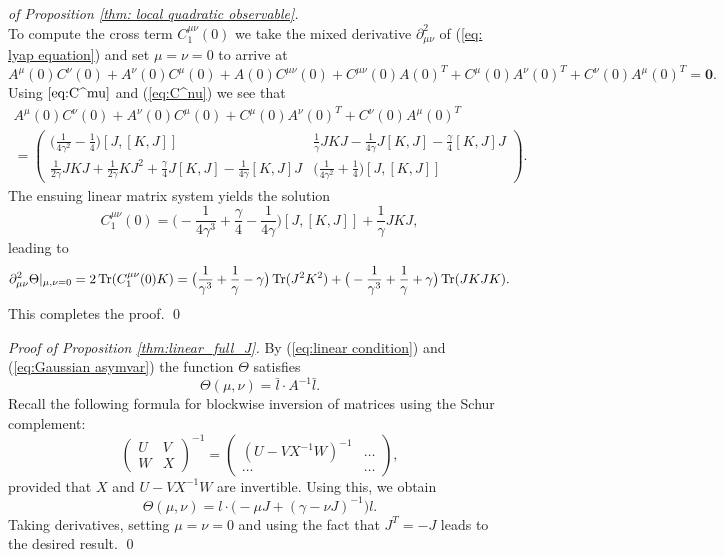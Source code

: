 \begin{proof}[of Proposition \ref{thm: local quadratic observable}]
\[	\]
	To compute the cross term $C_{1}^{\mu\nu}(0)$ we take the mixed derivative
	$\partial_{\mu\nu}^{2}$ of (\ref{eq: lyap equation}) and set $\mu=\nu=0$
	to arrive at 
	\[
	A^{\mu}(0)C^{\nu}(0)+A^{\nu}(0)C^{\mu}(0)+A(0)C^{\mu\nu}(0)+C^{\mu\nu}(0)A(0)^{T}+C^{\mu}(0)A^{\nu}(0)^{T}+C^{\nu}(0)A^{\mu}(0)^{T}=\boldsymbol{0}.
	\]
	Using $\eqref{eq:C^mu}$ and (\ref{eq:C^nu}) we see that 
	\begin{multline*}
	A^{\mu}(0)C^{\nu}(0)+A^{\nu}(0)C^{\mu}(0)+C^{\mu}(0)A^{\nu}(0)^{T}+C^{\nu}(0)A^{\mu}(0)^{T}\\
	=\left(\begin{array}{cc}
	\big(\frac{1}{4\gamma^{2}}-\frac{1}{4}\big)[J,[K,J]] & \frac{1}{\gamma}JKJ-\frac{1}{4\gamma}J[K,J]-\frac{\gamma}{4}[K,J]J\\
	\frac{1}{2\gamma}JKJ+\frac{1}{2\gamma}KJ^{2}+\frac{\gamma}{4}J[K,J]-\frac{1}{4\gamma}[K,J]J & \big(\frac{1}{4\gamma^{2}}+\frac{1}{4}\big)[J,[K,J]]
	\end{array}\right).
	\end{multline*}
	The ensuing linear matrix system yields the solution
	\[
	C_{1}^{\mu\nu}(0)=\big(-\frac{1}{4\gamma^{3}}+\frac{\gamma}{4}-\frac{1}{4\gamma}\big)[J,[K,J]]+\frac{1}{\gamma}JKJ,
	\]
	leading to 
	\begin{equation}
	\partial_{\mu\nu}^{2}\Theta\vert_{\mu,\nu=0}=2\operatorname{Tr}(C_{1}^{\mu\nu}(0)K)=\big(\frac{1}{\gamma^{3}}+\frac{1}{\gamma}-\gamma\big)\operatorname{Tr}(J^{2}K^{2})+\big(-\frac{1}{\gamma^{3}}+\frac{1}{\gamma}+\gamma\big)\operatorname{Tr}(JKJK).
	\end{equation}
	This completes the proof.
	\qed 
    \end{proof}
\begin{proof}
	[Proof of Proposition \ref{thm:linear_full_J}] By (\ref{eq:linear condition})
	and (\ref{eq:Gaussian asymvar}) the function $\Theta$ satisfies
	\[
	\Theta(\mu,\nu)=\bar{l}\cdot A^{-1}\bar{l}.
	\]
	Recall the following formula for blockwise inversion of matrices using the Schur complement:
	\begin{equation}
	\left(\begin{array}{cc}
	U & V\\
	W & X
	\end{array}\right)^{-1}=\left(\begin{array}{cc}
	(U-VX^{-1}W)^{-1} & \ldots\\
	\ldots & \ldots
	\end{array}\right),\label{eq: blockwise inversion}
	\end{equation}
	provided that $X$ and $U-VX^{-1}W$ are invertible. Using this, we obtain 
	\[
	\Theta(\mu,\nu)=l\cdot\big(-\mu J+(\gamma-\nu J)^{-1}\big)l.
	\]
	Taking derivatives, setting $\mu=\nu=0$ and using the fact that $J^{T}=-J$
	leads to the desired result.
	\qed
\end{proof}


